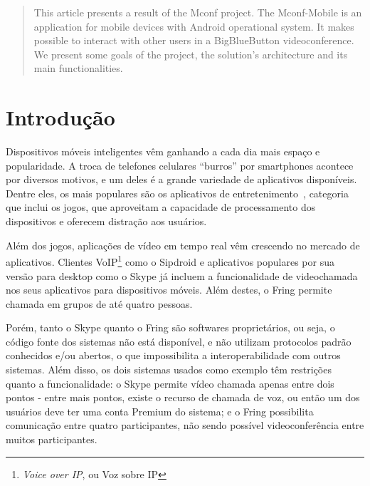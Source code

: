 \documentclass{acm_proc_article-sp}
\begin{document}
\begin{abstract}
  This article presents a result of the Mconf project. The Mconf-Mobile is an application for mobile devices with Android operational system. It makes possible to interact with other users in a BigBlueButton videoconference. We present some goals of the project, the solution's architecture and its main functionalities.
\end{abstract}






\section{Introdução}

Dispositivos móveis inteligentes vêm ganhando a cada dia mais espaço e popularidade. A troca de telefones celulares ``burros'' por smartphones acontece por diversos motivos, e um deles é a grande variedade de aplicativos disponíveis. Dentre eles, os mais populares são os aplicativos de entretenimento~\cite{android-stats}, categoria que inclui os jogos, que aproveitam a capacidade de processamento dos dispositivos e oferecem distração aos usuários.

Além dos jogos, aplicações de vídeo em tempo real vêm crescendo no mercado de aplicativos. Clientes VoIP\footnote{\emph{Voice over IP}, ou Voz sobre IP} como o Sipdroid e aplicativos populares por sua versão para desktop como o Skype já incluem a funcionalidade de videochamada nos seus aplicativos para dispositivos móveis. Além destes, o Fring permite chamada em grupos de até quatro pessoas.

Porém, tanto o Skype quanto o Fring são softwares proprietários, ou seja, o código fonte dos sistemas não está disponível, e não utilizam protocolos padrão conhecidos e/ou abertos, o que impossibilita a interoperabilidade com outros sistemas. Além disso, os dois sistemas usados como exemplo têm restrições quanto a funcionalidade: o Skype permite vídeo chamada apenas entre dois pontos - entre mais pontos, existe o recurso de chamada de voz, ou então um dos usuários deve ter uma conta Premium do sistema; e o Fring possibilita comunicação entre quatro participantes, não sendo possível videoconferência entre muitos participantes.
\end{document}
